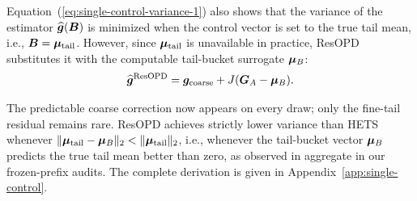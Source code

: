 Equation~(\ref{eq:single-control-variance-1}) also shows that the variance of the estimator $\widehat{\bm{g}}(\bm{B})$ is minimized when the control vector is set to the true tail mean, i.e., $\bm{B} = \bm{\mu}_{\mathrm{tail}}$. However, since $\bm{\mu}_{\mathrm{tail}}$ is unavailable in practice, ResOPD substitutes it with the computable tail-bucket surrogate $\bm{\mu}_B$:
\begin{equation}
\widehat{\bm{g}}^{\mathrm{ResOPD}}
=\bm{g}_{\mathrm{coarse}}+J(\bm{G}_A-\bm{\mu}_B).
\label{eq:event}
\end{equation}

The predictable coarse correction now appears on every draw; only the
fine-tail residual remains rare.
ResOPD achieves strictly lower variance than HETS whenever $\lVert\bm{\mu}_{\mathrm{tail}}-\bm{\mu}_B\rVert_2 < \lVert\bm{\mu}_{\mathrm{tail}}\rVert_2$, i.e., whenever the tail-bucket vector $\bm{\mu}_B$ predicts the true tail mean better than zero, as observed in aggregate in our frozen-prefix audits. The complete derivation is given in Appendix~\ref{app:single-control}.




